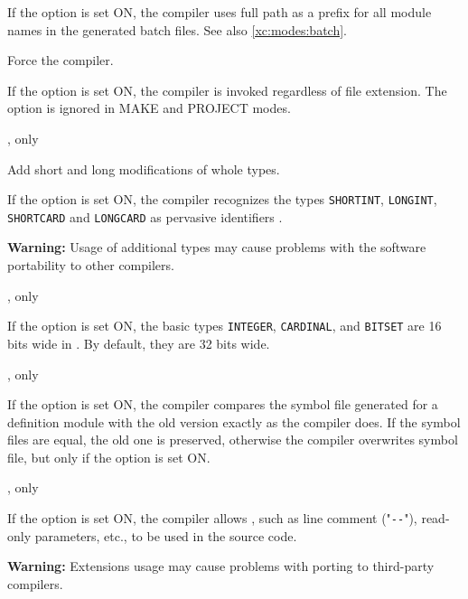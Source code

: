 \begin{description}
        If the option is set ON, the compiler uses full
        path as a prefix for all module names
        in the generated batch files. See also
        \ref{xc:modes:batch}.

        \MLBegin{}\ModeC{}\MLEnd{}

        Force the \mt{} compiler.

        If the option is set ON, the \mt{}  compiler is invoked
        regardless of file extension.  The
        option is ignored in MAKE and PROJECT modes.


        \MLBegin{}\ModeC{},\mt{} only\MLEnd{} \header

        Add short and long modifications of whole types.

        If the option is set ON, the compiler recognizes the
        types {\tt SHORTINT}, {\tt LONGINT}, {\tt SHORTCARD}
        and {\tt LONGCARD} as pervasive identifiers .

        {\bf Warning:}  Usage of additional types may cause
        problems with the software portability to other
        compilers.

        \MLBegin{}\ModeC{},\mt{} only\MLEnd{} \header

        If the option is set ON, the basic types {\tt INTEGER},
        {\tt CARDINAL}, and {\tt BITSET}
        are 16 bits wide in \mt{}. By default, they are 32 bits wide.

        \MLBegin{}\ModeC{},\mt{} only\MLEnd{}

        If the option is set ON, the \mt{} compiler compares the symbol file
        generated for a definition module with the old
        version exactly as the \ot{} compiler does.
        If the symbol files are equal, the old one
        is preserved, otherwise the compiler overwrites symbol
        file, but only if the  option is set ON.

        \MLBegin{}\ModeC{},\mt{} only\MLEnd{} \header

        If the option is set ON, the compiler allows
        , such as line comment
        ("\verb|--|"), read-only parameters, etc.,
        to be used in the source code.

        {\bf Warning:}  Extensions usage may cause problems with
        porting to third-party compilers.


\end{description}
